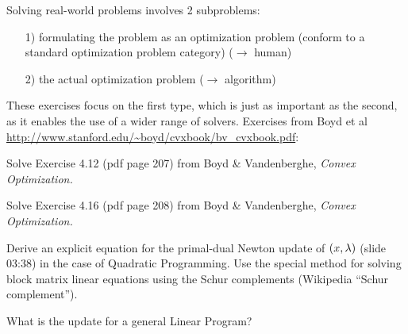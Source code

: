 

\renewcommand{\course}{Optimization}
\renewcommand{\coursepicture}{optim}
\renewcommand{\coursedate}{Summer 2015}
\renewcommand{\exnum}{7}

\exercises


Solving real-world problems involves 2 subproblems:
\begin{enumerate}
\item[1)] formulating the problem as an optimization problem (conform to a
standard optimization problem category) ($\to$ human)
\item[2)] the actual optimization problem ($\to$ algorithm)
\end{enumerate}

These exercises focus on the first type, which is just as important as the
second, as it enables the use of a wider range of solvers.  Exercises from Boyd
et al \url{http://www.stanford.edu/~boyd/cvxbook/bv_cvxbook.pdf}:



Solve Exercise 4.12 (pdf page 207) from  Boyd \& Vandenberghe,
\emph{Convex Optimization.}



Solve Exercise 4.16 (pdf page 208) from  Boyd \& Vandenberghe,
\emph{Convex Optimization.}



Derive an explicit equation for the primal-dual Newton update of
$(x,\lambda)$ (slide 03:38) in the case of Quadratic Programming.  Use the
special method for solving block matrix linear equations using the
Schur complements (Wikipedia ``Schur complement'').

What is the update for a general Linear Program?

\exerfoot
